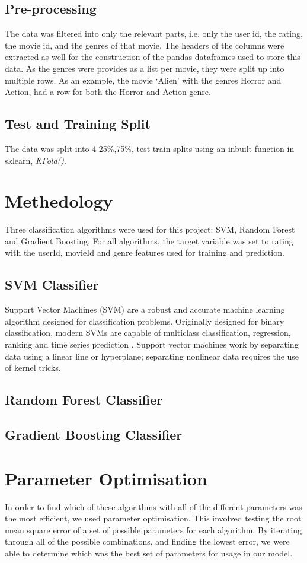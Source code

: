 \documentclass{report}
\begin{document}
	\subsection{Pre-processing}
	The data was filtered into only the relevant parts, i.e. only the user id, the rating, the movie id, and the genres of that movie. The headers of the columns were extracted as well for the construction of the pandas dataframes used to store this data. As the genres were provides as a list per movie, they were split up into multiple rows. As an example, the movie ‘Alien’ with the genres Horror and Action, had a row for both the Horror and Action genre.
	
	\subsection{Test and Training Split}
	The data was split into 4 25\%,75\%, test-train splits using an inbuilt function in sklearn, \emph{KFold()}.
	\section{Methedology}
	Three classification algorithms were used for this project: SVM, Random Forest and Gradient Boosting. For all algorithms, the target variable was set to rating with the userId, movieId and genre features used for training and prediction.
	\subsection{SVM Classifier}
	Support Vector Machines (SVM) are a robust and accurate machine learning algorithm designed for classification problems. Originally designed for binary classification, modern SVMs are capable of multiclass classification, regression, ranking and time series prediction \autocite{KarlPersson}. Support vector machines work by separating data using a linear line or hyperplane; separating nonlinear data requires the use of kernel tricks.
	\subsection{Random Forest Classifier}
	\subsection{Gradient Boosting Classifier}
	\section{Parameter Optimisation}
	In order to find which of these algorithms with all of the different parameters was the most efficient, we used parameter optimisation. This involved testing the root mean square error of a set of possible parameters for each algorithm. By iterating through all of the possible combinations, and finding the lowest error, we were able to determine which was the best set of parameters for usage in our model.
	
\end{document}
